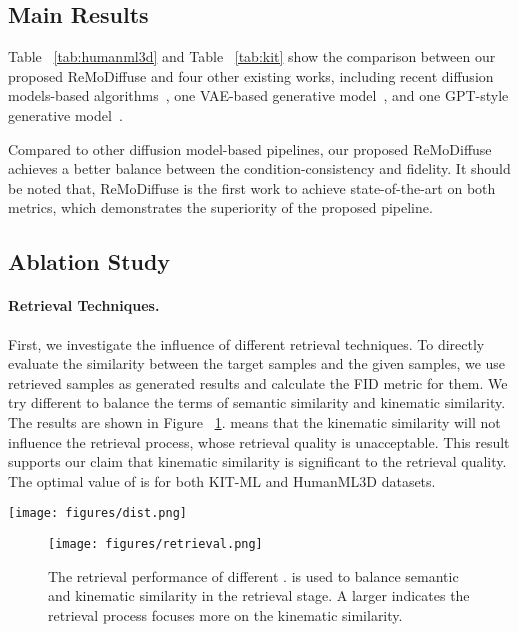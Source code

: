 \documentclass[10pt,twocolumn,letterpaper]{article}
\newcommand{\name}{ReMoDiffuse\xspace}
\begin{document}
\subsection{Main Results}




Table ~\ref{tab:humanml3d} and Table ~\ref{tab:kit} show the comparison between our proposed \name and four other existing works, including recent diffusion models-based algorithms~\cite{tevet2022human, zhang2022motiondiffuse}, one VAE-based generative model~\cite{guo2022generating}, and one GPT-style generative model~\cite{zhang2023generating}.


Compared to other diffusion model-based pipelines, our proposed \name achieves a better balance between the condition-consistency and fidelity. It should be noted that, \name is the first work to achieve state-of-the-art on both metrics, which demonstrates the superiority of the proposed pipeline. 


\subsection{Ablation Study}



\paragraph{Retrieval Techniques.} First, we investigate the influence of different retrieval techniques. To directly evaluate the similarity between the target samples and the given samples, we use retrieved samples as generated results and calculate the FID metric for them. We try different  to balance the terms of semantic similarity and kinematic similarity. The results are shown in Figure ~\ref{fig:retrieval}.  means that the kinematic similarity will not influence the retrieval process, whose retrieval quality is unacceptable. This result supports our claim that kinematic similarity is significant to the retrieval quality. The optimal value of  is  for both KIT-ML and HumanML3D datasets.

\begin{figure*}[h]
    \centering
    \texttt{[image: figures/dist.png]}
    \caption{\textbf{Rareness distribution of HumanML3D test split.} We split all testcases into 100 bins according to its Rareness value.}
    \label{fig:dist}
\end{figure*}

\begin{figure}[t]
    \centering
    \texttt{[image: figures/retrieval.png]}
    \caption{The retrieval performance of different .  is used to balance semantic and kinematic similarity in the retrieval stage. A larger  indicates the retrieval process focuses more on the kinematic similarity.}
    \label{fig:retrieval}
    \vspace{-15pt}
\end{figure}
\end{document}

